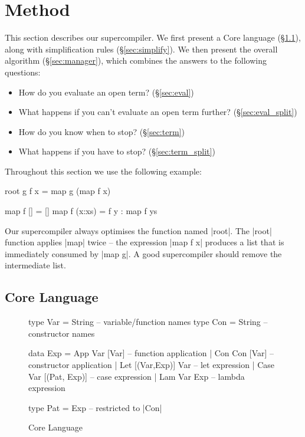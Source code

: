 \documentclass[draft]{sigplanconf}
\begin{document}
\section{Method}
\label{sec:method}

This section describes our supercompiler. We first present a Core language (\S\ref{sec:core}), along with simplification rules (\S\ref{sec:simplify}). We then present the overall algorithm (\S\ref{sec:manager}), which combines the answers to the following questions:

\begin{itemize}
\item How do you evaluate an open term? (\S\ref{sec:eval})
\item What happens if you can't evaluate an open term further? (\S\ref{sec:eval_split})
\item How do you know when to stop? (\S\ref{sec:term})
\item What happens if you have to stop? (\S\ref{sec:term_split})
\end{itemize}

\noindent Throughout this section we use the following example:

\begin{code}
root g f x = map g (map f x)

map f []      = []
map f (x:xs)  = f y : map f ys
\end{code}

Our supercompiler always optimises the function named |root|. The |root| function applies |map| twice -- the expression |map f x| produces a list that is immediately consumed by |map g|. A good supercompiler should remove the intermediate list.

\subsection{Core Language}
\label{sec:core}

\begin{figure}
\begin{code}
type Var   =   String -- variable/function names
type Con   =   String -- constructor names

data Exp   =   App Var [Var]           -- function application
           |   Con Con [Var]           -- constructor application
           |   Let [(Var,Exp)] Var     -- let expression
           |   Case Var [(Pat, Exp)]   -- case expression
           |   Lam Var Exp             -- lambda expression

type Pat   =   Exp -- restricted to |Con|
\end{code}
\caption{Core Language}
\label{fig:core}
\end{figure}
\end{document}
